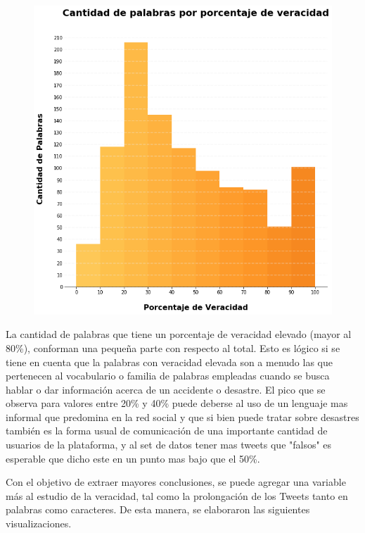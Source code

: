 \documentclass[titlepage,a4paper]{article}
\begin{document}
    \begin{figure}[H]
    \centering
    \includegraphics[width=1\textwidth]{graficos/Analisis Lexico Grafico/cantidad_de_palabras_por_porcentaje_de_veracidad.png}
    \caption{}
    \end{figure}

    La cantidad de palabras que tiene un porcentaje de veracidad elevado (mayor al 80\%), conforman una pequeña parte con respecto al total. Esto es lógico si se tiene en cuenta que la palabras con veracidad elevada son a menudo las que pertenecen al vocabulario o familia de palabras empleadas cuando se busca hablar o dar información acerca de un accidente o desastre. El pico que se observa para valores entre  20\% y  40\% puede deberse al uso de un lenguaje mas informal que predomina en la red social y que si bien puede tratar sobre desastres también es la forma usual de comunicación de una importante cantidad de usuarios de la plataforma, y al set de datos tener mas tweets que "falsos" es esperable que dicho este en un punto mas bajo que el 50\%. 
    
    Con el objetivo de extraer mayores conclusiones, se puede agregar una variable más al estudio de la veracidad, tal como la prolongación de los Tweets tanto en palabras como caracteres. De esta manera, se elaboraron las siguientes visualizaciones.
\end{document}
